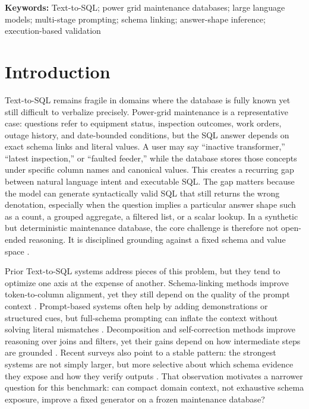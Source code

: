 \documentclass{article}
\begin{document}
\textbf{Keywords:} Text-to-SQL; power grid maintenance databases; large language models; multi-stage prompting; schema linking; answer-shape inference; execution-based validation

\section{Introduction}\label{introduction}

Text-to-SQL remains fragile in domains where the database is fully known yet still difficult to verbalize precisely. Power-grid maintenance is a representative case: questions refer to equipment status, inspection outcomes, work orders, outage history, and date-bounded conditions, but the SQL answer depends on exact schema links and literal values. A user may say ``inactive transformer,'' ``latest inspection,'' or ``faulted feeder,'' while the database stores those concepts under specific column names and canonical values. This creates a recurring gap between natural language intent and executable SQL. The gap matters because the model can generate syntactically valid SQL that still returns the wrong denotation, especially when the question implies a particular answer shape such as a count, a grouped aggregate, a filtered list, or a scalar lookup. In a synthetic but deterministic maintenance database, the core challenge is therefore not open-ended reasoning. It is disciplined grounding against a fixed schema and value space \cite{zhong2020semantic,lei2020reexamining,liu2022semantic,quamar2022natural}.

Prior Text-to-SQL systems address pieces of this problem, but they tend to optimize one axis at the expense of another. Schema-linking methods improve token-to-column alignment, yet they still depend on the quality of the prompt context \cite{lei2020reexamining,gan2021robustness,liu2021awakening}. Prompt-based systems often help by adding demonstrations or structured cues, but full-schema prompting can inflate the context without solving literal mismatches \cite{chang2023prompt,nan2023enhancing,sun2023sqlprompt}. Decomposition and self-correction methods improve reasoning over joins and filters, yet their gains depend on how intermediate steps are grounded \cite{pourreza2023dinsql,wang2023macsql,talaei2024chess}. Recent surveys also point to a stable pattern: the strongest systems are not simply larger, but more selective about which schema evidence they expose and how they verify outputs \cite{liu2024survey,katsogiannismeimarakis2023survey,huang2024survey}. That observation motivates a narrower question for this benchmark: can compact domain context, not exhaustive schema exposure, improve a fixed generator on a frozen maintenance database?
\end{document}
